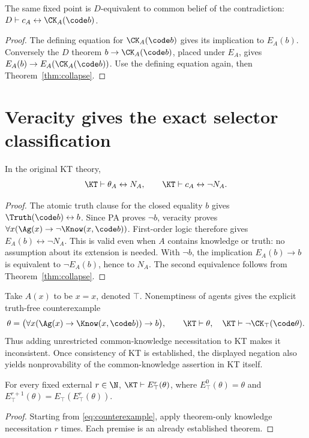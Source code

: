 \documentclass[11pt]{article}
\begin{document}
\begin{corollary}
The same fixed point is $D$-equivalent to common belief of the
contradiction: $D\vdash c_A\leftrightarrow\CK_A(\code b)$.
\end{corollary}
\begin{proof}
The defining equation for $\CK_A(\code b)$ gives its implication to
$E_A(b)$. Conversely the $D$ theorem $b\to\CK_A(\code b)$, placed
under $E_A$, gives $E_A(b)\to E_A(\CK_A(\code b))$.
Use the defining equation again, then Theorem~\ref{thm:collapse}.
\end{proof}

\section{Veracity gives the exact selector classification}

\begin{theorem}\label{thm:selector}
In the original KT theory,
\[
 \KT\vdash\theta_A\leftrightarrow N_A,
 \qquad
 \KT\vdash c_A\leftrightarrow\neg N_A.
\]
\end{theorem}
\begin{proof}
The atomic truth clause for the closed equality $b$ gives
$\Truth(\code b)\leftrightarrow b$. Since PA proves $\neg b$,
veracity proves
$\forall x(\Ag(x)\to\neg\Know(x,\code b))$.
First-order logic therefore gives
$E_A(b)\leftrightarrow\neg N_A$. This is valid even when $A$
contains knowledge or truth: no assumption about its extension is
needed. With $\neg b$, the implication $E_A(b)\to b$ is equivalent
to $\neg E_A(b)$, hence to $N_A$. The second equivalence follows from
Theorem~\ref{thm:collapse}.
\end{proof}

Take $A(x)$ to be $x=x$, denoted $\top$. Nonemptiness of agents gives
the explicit truth-free counterexample
\begin{equation}\label{eq:counterexample}
 \theta=\bigl(\forall x(\Ag(x)\to\Know(x,\code b))\to b\bigr),
 \qquad
 \KT\vdash\theta,\quad
 \KT\vdash\neg\CK_\top(\code\theta).
\end{equation}
Thus adding unrestricted common-knowledge necessitation to KT makes
it inconsistent. Once consistency of KT is established, the displayed
negation also yields nonprovability of the common-knowledge assertion
in KT itself.

\begin{corollary}\label{cor:finite}
For every fixed external $r\in\N$, $\KT\vdash E_\top^r(\theta)$,
where $E_\top^0(\theta)=\theta$ and
$E_\top^{r+1}(\theta)=E_\top(E_\top^r(\theta))$.
\end{corollary}
\begin{proof}
Starting from \eqref{eq:counterexample}, apply theorem-only knowledge
necessitation $r$ times. Each premise is an already established theorem.
\end{proof}
\end{document}
